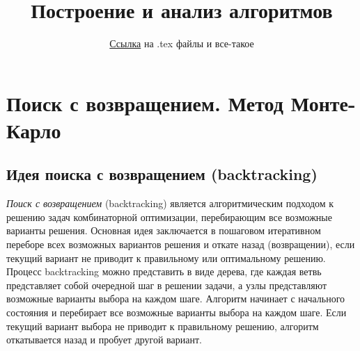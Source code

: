 


\newcommand{\bolditalic}[1]{\textbf{\textit{#1}}}

\title{Построение и анализ алгоритмов}



\author{
\href{https://github.com/danilpavlov/latex_lib}{Ссылка} на .tex файлы и все-такое}
\maketitle
\tableofcontents
\newpage

\section{Поиск с возвращением. Метод Монте-Карло}

    \subsection{Идея поиска с возвращением (backtracking)}

    \textit{Поиск с возвращением} (backtracking) является алгоритмическим подходом к решению задач комбинаторной оптимизации, перебирающим все возможные варианты решения. Основная идея заключается в пошаговом итеративном переборе всех возможных вариантов решения и откате назад (возвращении), если текущий вариант не приводит к правильному или оптимальному решению.\\

    Процесс backtracking можно представить в виде дерева, где каждая ветвь представляет собой очередной шаг в решении задачи, а узлы представляют возможные варианты выбора на каждом шаге. Алгоритм начинает с начального состояния и перебирает все возможные варианты выбора на каждом шаге. Если текущий вариант выбора не приводит к правильному решению, алгоритм откатывается назад и пробует другой вариант.\\

